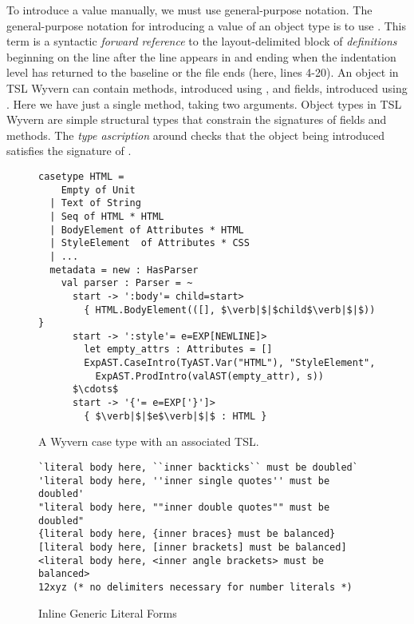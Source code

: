 To introduce a value manually, we must use {general-purpose notation}. The general-purpose notation for introducing a value of an object type is to use . This term is a syntactic \emph{forward reference} to the layout-delimited block of \emph{definitions} beginning on the line after the line  appears in and ending when the indentation level has returned to the baseline or the file ends (here, lines 4-20). An object in TSL Wyvern can contain methods, introduced using , and fields, introduced using . Here we have just a single method,  taking two arguments. Object types in TSL Wyvern are simple structural types that constrain the signatures of fields and methods. The \emph{type ascription} around  checks that the object being introduced satisfies the signature of .

\begin{figure}[t]
\begin{lstlisting}[escapechar=$]
casetype HTML = 
    Empty of Unit
  | Text of String
  | Seq of HTML * HTML 
  | BodyElement of Attributes * HTML
  | StyleElement  of Attributes * CSS
  | ...
  metadata = new : HasParser
    val parser : Parser = ~
      start -> ':body'= child=start>
        { HTML.BodyElement(([], $\verb|$|$child$\verb|$|$)) }
      start -> ':style'= e=EXP[NEWLINE]>
        let empty_attrs : Attributes = []
        ExpAST.CaseIntro(TyAST.Var("HTML"), "StyleElement",
          ExpAST.ProdIntro(valAST(empty_attr), s))
      $\cdots$
      start -> '{'= e=EXP['}']>
        { $\verb|$|$e$\verb|$|$ : HTML }
\end{lstlisting}
\vspace{-8px}
\caption{A Wyvern case type with an associated TSL.}
\vspace{-10px}
\label{f-htmltype}
\end{figure}
\begin{figure}[t]
\begin{lstlisting}[mathescape]
`literal body here, ``inner backticks`` must be doubled`
'literal body here, ''inner single quotes'' must be doubled'
"literal body here, ""inner double quotes"" must be doubled"
{literal body here, {inner braces} must be balanced}
[literal body here, [inner brackets] must be balanced]
<literal body here, <inner angle brackets> must be balanced>
12xyz (* no delimiters necessary for number literals *)
\end{lstlisting}
\vspace{-8px}
\caption{Inline Generic Literal Forms }
\vspace{-15px}
\label{f-delims}
\end{figure}

